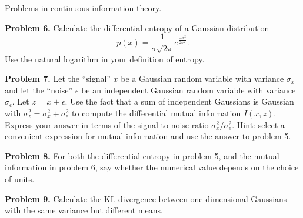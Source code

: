 \documentclass{article}
\newcommand{\solution}[1]{}
\begin{document}
\bigskip
Problems in continuous information theory.

\bigskip
{\bf Problem 6.}
Calculate the differential entropy of a Gaussian distribution
$$p(x) = \frac{1}{\sigma\sqrt{2\pi}}e^{\frac{-x^2}{2\sigma^2}}.$$
Use the natural logarithm in your definition of entropy.

\solution{
\begin{eqnarray*}
H(p) & = & E_{x \sim P} -\ln p(x) \\
\\
& = & E_{x \sim P}\; \frac{x^2}{2 \sigma^2} + \ln \sigma + \ln \sqrt{2\pi} \\
\\
& = & \frac{\sigma^2}{2\sigma^2} + \ln \sigma + \frac{1}{2}\ln 2\pi \\
\\
& = & \ln \sigma + \frac{1}{2}(1 + \ln 2\pi)
\end{eqnarray*}
}

\bigskip
{\bf Problem 7.} Let the ``signal'' $x$ be a Gaussian random variable with variance $\sigma_x$ and let the ``noise'' $\epsilon$ be an independent Gaussian random variable with
variance $\sigma_\epsilon$.  Let $z = x + \epsilon$.  Use the fact that a sum of independent Gaussians is Gaussian with $\sigma^2_z = \sigma^2_x + \sigma^2_\epsilon$
to compute the differential mutual information $I(x,z)$.  Express your answer in terms of the signal to noise ratio $\sigma^2_x/\sigma^2_\epsilon$.
Hint: select a convenient expression for mutual information and use the answer to problem 5.

\solution{
\begin{eqnarray*}
I(z,x) & = & H(z) - H(z|x) \\
\\
& = & \ln (\sigma^2_x + \sigma^2_\epsilon) - \ln \sigma^2_\epsilon \\
\\
& = & \ln \left(\frac{\sigma^2_x + \sigma^2_\epsilon}{\sigma^2_\epsilon}\right) \\
\\
& = & \ln \left(1 + \frac{\sigma^2_x}{\sigma^2_\epsilon} \right)
\end{eqnarray*}
}

\bigskip
{\bf Problem 8.} For both the differential entropy in problem 5,  and the mutual information in problem 6, say whether the numerical value depends on the choice of units.

\solution{
          The numerical value of differential entropy is sensitive to the units we choose for $\sigma$.  As long as $\sigma_x$ and $\sigma_\epsilon$
          are measured in the same units, the numerical value of the mutual information is units-independent. This is consistent with the fact
          that differential entropy is not directly meaningful while mutual information can be written as a KL-divergence and differential KL-divergence
          is meaningful.
          }

\bigskip
{\bf Problem 9.} Calculate the KL divergence between one dimensional Gaussians with the same variance but different means.

  
\end{document}
